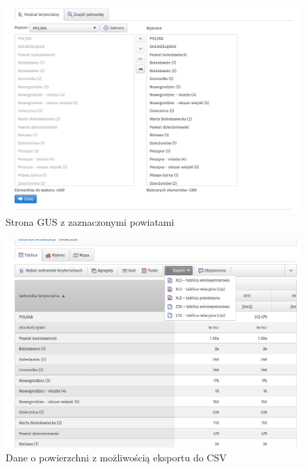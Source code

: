 \documentclass[12pt]{article}
\begin{document}
\begin{figure}[H]
    \caption{Strona GUS z zaznaczonymi powiatami}
    \centering
    \includegraphics[width=1.0\textwidth]{dane4}
\end{figure}
\begin{figure}[H]
    \caption{Dane o powierzchni z możliwością eksportu do CSV}
    \centering
    \includegraphics[width=1.0\textwidth]{dane5}
\end{figure}
\end{document}
